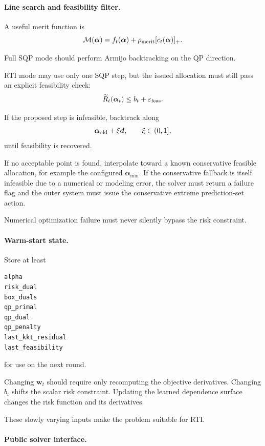 \documentclass[11pt]{article}
\begin{document}
\paragraph{Line search and feasibility filter.}

A useful merit function is
\[
    \mathcal M(\bm\alpha)
    =
    f_t(\bm\alpha)
    +
    \rho_{\rm merit}
    [c_t(\bm\alpha)]_+.
\]

Full SQP mode should perform Armijo backtracking on the QP direction.

RTI mode may use only one SQP step, but the issued allocation must still pass
an explicit feasibility check:
\[
    \widetilde R_t(\bm\alpha_t)
    \le
    b_t+\varepsilon_{\rm feas}.
\]

If the proposed step is infeasible, backtrack along
\[
    \bm\alpha_{\rm old}
    +
    \xi\bm d,
    \qquad
    \xi\in(0,1],
\]
until feasibility is recovered.

If no acceptable point is found, interpolate toward a known conservative
feasible allocation, for example the configured
$\bm\alpha_{\min}$.  If the conservative fallback is itself infeasible due to
a numerical or modeling error, the solver must return a failure flag and the
outer system must issue the conservative extreme prediction-set action.

Numerical optimization failure must never silently bypass the risk
constraint.

\paragraph{Warm-start state.}

Store at least

\begin{verbatim}
alpha
risk_dual
box_duals
qp_primal
qp_dual
qp_penalty
last_kkt_residual
last_feasibility
\end{verbatim}

for use on the next round.

Changing $\bm w_t$ should require only recomputing the objective derivatives.
Changing $b_t$ shifts the scalar risk constraint.  Updating the learned
dependence surface changes the risk function and its derivatives.

These slowly varying inputs make the problem suitable for RTI.

\paragraph{Public solver interface.}
\end{document}
